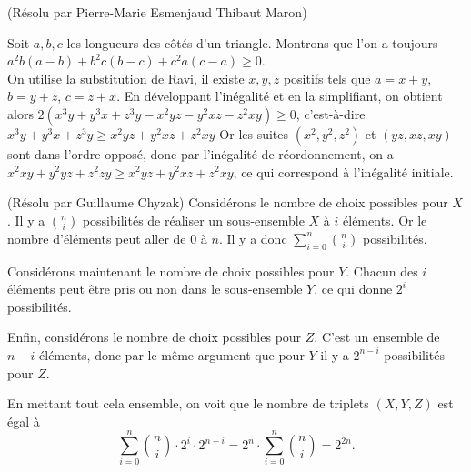 \begin{sol}[69](Résolu par Pierre-Marie Esmenjaud Thibaut Maron)

Soit $a,b,c$ les longueurs des côtés d'un triangle. Montrons que l'on a toujours $a^2b(a-b)+b^2c(b-c)+c^2a(c-a) \geq 0$.\\
On utilise la substitution de Ravi, il existe $x,y,z$ positifs tels que 
$a=x+y$,$b=y+z$, $c=z+x$.
En développant l'inégalité et en la simplifiant, on obtient alors
$2(x^3y+y^3x+z^3y-x^2yz-y^2xz-z^2xy) \geq 0$,
c'est-\`a-dire $x^3y+y^3x+z^3y \geq x^2yz+y^2xz+z^2xy$
Or les suites $(x^2,y^2,z^2)$ et $(yz,xz,xy)$ sont dans l'ordre opposé, donc par l'in\'egalit\'e de r\'eordonnement,
on a $x^2xy+y^2yz+z^2zy \geq x^2yz+y^2xz+z^2xy$, ce qui correspond \`a l'in\'egalit\'e initiale.

\end{sol}


\begin{sol}[73](R\'esolu par Guillaume Chyzak)
Consid\'erons le nombre de choix possibles pour $X$. Il y a $n\choose i$ possibilit\'es de r\'ealiser un sous-ensemble $X$ \`a $i$ \'el\'ements. Or le nombre d'\'el\'ements peut aller de 0 \`a $n$. Il y a donc $\sum_{i=0}^n {n\choose i}$ possibilit\'es.

Consid\'erons maintenant le nombre de choix possibles pour $Y$. Chacun des $i$ \'el\'ements peut \^etre pris ou non dans le sous-ensemble $Y$, ce qui donne $2^i$ possibilit\'es.

Enfin, consid\'erons le nombre de choix possibles pour $Z$. C'est un ensemble de $n-i$ \'el\'ements, donc par le m\^eme argument que pour $Y$ il y a $2^{n-i}$ possibilit\'es pour $Z$.

En mettant tout cela ensemble, on voit que le nombre de triplets $(X,Y,Z)$ est \'egal \`a
\[\sum_{i=0}^n {n\choose i} \cdot 2^i\cdot 2^{n-i}=2^n\cdot\sum_{i=0}^n {n\choose i}=2^{2n}.\]

\end{sol}

